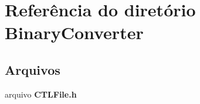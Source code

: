 \section{Referência do diretório Binary\+Converter}
\label{dir_fef37710dda3d2a54e1183aa89e9dd9d}
\subsection*{Arquivos}
\begin{DoxyCompactItemize}
\item 
arquivo {\bf C\+T\+L\+File.\+h}
\end{DoxyCompactItemize}
